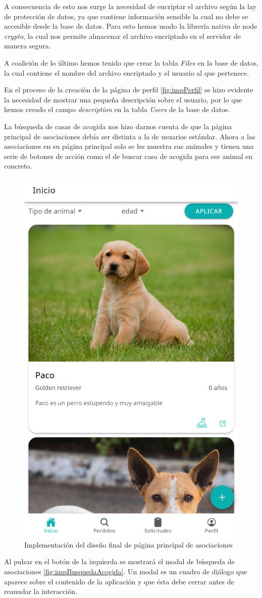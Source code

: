 A consecuencia de esto nos surge la necesidad de encriptar el archivo según la lay de protección de datos, ya que contiene información sensible la cual no debe se accesible desde la base de datos. Para esto hemos usado la librería nativa de node \textit{crypto}, la cual nos permite almacenar el archivo encriptado en el servidor de manera segura.

A coalición de lo último hemos tenido que crear la tabla \textit{Files} en la base de datos, la cual contiene el nombre del archivo encriptado y el usuario al que pertenece.


En el proceso de la creación de la página de perfil \ref{fig:impPerfil} se hizo evidente la necesidad de mostrar una pequeña descripción sobre el usuario, por lo que hemos creado el campo \textit{description} en la tabla \textit{Users} de la base de datos.

La búsqueda de casas de acogida nos hizo darnos cuenta de que la página principal de asociaciones debía ser distinta a la de usuarios estándar. Ahora a las asociaciones en su página principal solo se les muestra sus animales y tienen una serie de botones de acción como el de buscar casa de acogida para ese animal en concreto.



\begin{figure}[H]
	\centering
	\includegraphics[width=0.31\linewidth]{"sprint 3/homeAsociaciones"}
	\caption{Implementación del diseño final de página principal de asociaciones}
	\label{fig:homeasociaciones}
\end{figure}

Al pulsar en el botón de la izquierda se mostrará el modal de búsqueda de asociaciones \ref{fig:impBusquedaAcogida}. Un modal es un cuadro de diálogo que aparece sobre el contenido de la aplicación y que ésta debe cerrar antes de reanudar la interacción.

